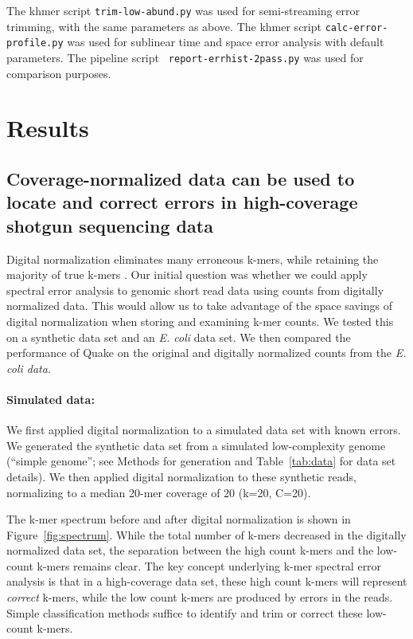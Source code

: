 \documentclass{article}
\begin{document}
The khmer script {\tt trim-low-abund.py} was used for semi-streaming
error trimming, with the same parameters as above.  The khmer script
{\tt calc-error-profile.py} was used for sublinear time and space
error analysis with default parameters.  The pipeline script {\tt
  report-errhist-2pass.py} was used for comparison purposes.

\section{Results}

\subsection{Coverage-normalized data can be used to locate
and correct errors in high-coverage shotgun sequencing data}

Digital normalization eliminates many erroneous k-mers, while
retaining the majority of true k-mers \cite{Brown2012}.  Our initial
question was whether we could apply spectral error analysis to genomic
short read data using counts from digitally normalized data. This
would allow us to take advantage of the space savings of digital
normalization when storing and examining k-mer counts.  We tested this
on a synthetic data set and an {\em E. coli} data set.  We then
compared the performance of Quake on the original and digitally
normalized counts from the {\em E. coli data}.

\paragraph{Simulated data:}
We first applied digital normalization to a simulated data set with
known errors.  We generated the synthetic data set from a simulated
low-complexity genome (``simple genome''; see Methods for generation
and Table~\ref{tab:data} for data set details). We then applied
digital normalization to these synthetic reads, normalizing to a
median 20-mer coverage of 20 (k=20, C=20).

The k-mer spectrum before and after digital normalization is shown in
Figure~\ref{fig:spectrum}.  While the total number of k-mers decreased
in the digitally normalized data set, the separation between the high
count k-mers and the low-count k-mers remains clear.  The key concept
underlying k-mer spectral error analysis is that in a high-coverage
data set, these high count k-mers will represent {\em correct} k-mers,
while the low count k-mers are produced by errors in the reads.
Simple classification methods suffice to identify and trim or correct
these low-count k-mers.
\end{document}
